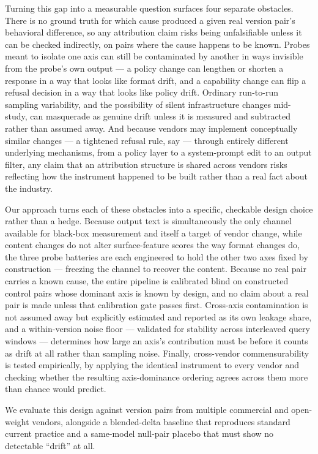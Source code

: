 \documentclass[11pt]{article}
\begin{document}
Turning this gap into a measurable question surfaces four separate obstacles. There is no ground truth for which cause produced a given real version pair's behavioral difference, so any attribution claim risks being unfalsifiable unless it can be checked indirectly, on pairs where the cause happens to be known. Probes meant to isolate one axis can still be contaminated by another in ways invisible from the probe's own output --- a policy change can lengthen or shorten a response in a way that looks like format drift, and a capability change can flip a refusal decision in a way that looks like policy drift. Ordinary run-to-run sampling variability, and the possibility of silent infrastructure changes mid-study, can masquerade as genuine drift unless it is measured and subtracted rather than assumed away. And because vendors may implement conceptually similar changes --- a tightened refusal rule, say --- through entirely different underlying mechanisms, from a policy layer to a system-prompt edit to an output filter, any claim that an attribution structure is shared across vendors risks reflecting how the instrument happened to be built rather than a real fact about the industry.

Our approach turns each of these obstacles into a specific, checkable design choice rather than a hedge. Because output text is simultaneously the only channel available for black-box measurement and itself a target of vendor change, while content changes do not alter surface-feature scores the way format changes do, the three probe batteries are each engineered to hold the other two axes fixed by construction --- freezing the channel to recover the content. Because no real pair carries a known cause, the entire pipeline is calibrated blind on constructed control pairs whose dominant axis is known by design, and no claim about a real pair is made unless that calibration gate passes first. Cross-axis contamination is not assumed away but explicitly estimated and reported as its own leakage share, and a within-version noise floor --- validated for stability across interleaved query windows --- determines how large an axis's contribution must be before it counts as drift at all rather than sampling noise. Finally, cross-vendor commensurability is tested empirically, by applying the identical instrument to every vendor and checking whether the resulting axis-dominance ordering agrees across them more than chance would predict.

We evaluate this design against version pairs from multiple commercial and open-weight vendors, alongside a blended-delta baseline that reproduces standard current practice and a same-model null-pair placebo that must show no detectable ``drift'' at all.
\end{document}
